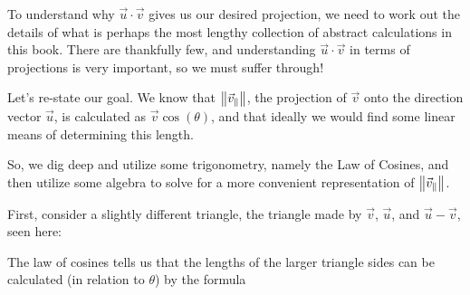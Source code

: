 \documentclass{ximera}
\begin{document}
     To understand why $\vec{u}\cdot\vec{v}$ gives us our desired projection, we need to work out the details of what is perhaps the most lengthy collection of abstract calculations in this book. There are thankfully few, and understanding $\vec{u}\cdot\vec{v}$ in terms of projections is very important, so we must suffer through!

     \begin{explanation}
      Let's re-state our goal. We know that $\left\|\vec{v}_\parallel\right\|$, the projection of $\vec{v}$ onto the direction vector $\vec{u}$, is calculated as $\vec{v}\cos(\theta)$, and that ideally we would find some linear means of determining this length. 

      So, we dig deep and utilize some trigonometry, namely the Law of Cosines, and then utilize some algebra to solve for a more convenient representation of $\left\|\vec{v}_\parallel\right\|$.

      First, consider a slightly different triangle, the triangle made by $\vec{v}$, $\vec{u}$, and $\vec{u}-\vec{v}$, seen here:

      \begin{center}
      \end{center}
      
      The law of cosines tells us that the lengths of the larger triangle sides can be calculated (in relation to $\theta$) by the formula
      

\end{explanation}
\end{document}
